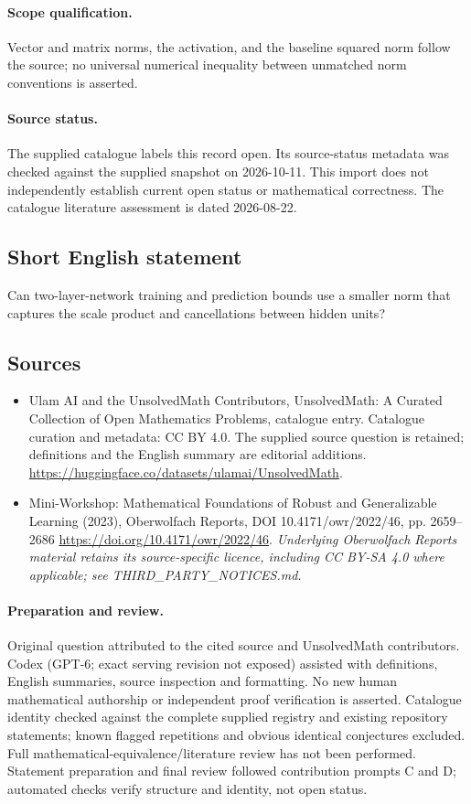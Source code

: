 \documentclass[11pt]{article}
\begin{document}
\paragraph{Scope qualification.}
Vector and matrix norms, the activation, and the baseline squared norm follow the source; no universal numerical inequality between unmatched norm conventions is asserted.
\paragraph{Source status.}
The supplied catalogue labels this record open. Its source-status metadata was checked against the supplied snapshot on 2026-10-11. This import does not independently establish current open status or mathematical correctness. The catalogue literature assessment is dated 2026-08-22.
\subsection{Short English statement}
Can two-layer-network training and prediction bounds use a smaller norm that captures the scale product and cancellations between hidden units?
\subsection{Sources}
\begin{itemize}
\item[S1] Ulam AI and the UnsolvedMath Contributors, UnsolvedMath: A Curated Collection of Open Mathematics Problems, catalogue entry. Catalogue curation and metadata: CC BY 4.0. The supplied source question is retained; definitions and the English summary are editorial additions.
\url{https://huggingface.co/datasets/ulamai/UnsolvedMath}.
\item[S2] Mini-Workshop: Mathematical Foundations of Robust and Generalizable Learning (2023), Oberwolfach Reports, DOI 10.4171/owr/2022/46, pp. 2659--2686
\url{https://doi.org/10.4171/owr/2022/46}.
\textit{Underlying Oberwolfach Reports material retains its source-specific licence, including CC BY-SA 4.0 where applicable; see THIRD\_PARTY\_NOTICES.md.}
\end{itemize}
\paragraph{Preparation and review.}
Original question attributed to the cited source and UnsolvedMath contributors. Codex (GPT-6; exact serving revision not exposed) assisted with definitions, English summaries, source inspection and formatting. No new human mathematical authorship or independent proof verification is asserted. Catalogue identity checked against the complete supplied registry and existing repository statements; known flagged repetitions and obvious identical conjectures excluded. Full mathematical-equivalence/literature review has not been performed. Statement preparation and final review followed contribution prompts C and D; automated checks verify structure and identity, not open status.
\label{end:statement}
\end{document}
